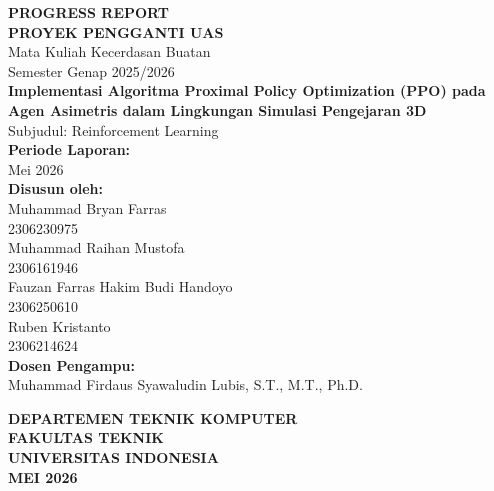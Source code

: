 \documentclass[12pt,a4paper]{article}
\begin{document}
\begin{titlepage}
    \centering
    \vspace*{1cm}
    
    {\Large \textbf{PROGRESS REPORT}} \\[0.5cm]
    {\Large \textbf{PROYEK PENGGANTI UAS}} \\[0.5cm]
    
    {\large Mata Kuliah Kecerdasan Buatan} \\[0.2cm]
    {\large Semester Genap 2025/2026} \\[2cm]
    
    {\Large \textbf{Implementasi Algoritma Proximal Policy Optimization (PPO) pada Agen Asimetris dalam Lingkungan Simulasi Pengejaran 3D}} \\[0.5cm]
    {\large Subjudul: Reinforcement Learning} \\[1.5cm]
    
    \textbf{Periode Laporan:} \\
    {Mei 2026} \\[1.5cm]
    
    \textbf{Disusun oleh:} \\[0.2cm]
    {Muhammad Bryan Farras} \\
    {2306230975} \\[0.2cm]
    {Muhammad Raihan Mustofa} \\
    {2306161946} \\[0.2cm]
    {Fauzan Farras Hakim Budi Handoyo} \\
    {2306250610} \\[0.2cm]
    {Ruben Kristanto} \\
    {2306214624} \\[1.5cm]
    
    \textbf{Dosen Pengampu:} \\
    {Muhammad Firdaus Syawaludin Lubis, S.T., M.T., Ph.D.} \\[1cm]
    
    \vfill
    
    {\large \textbf{DEPARTEMEN TEKNIK KOMPUTER}} \\
    {\large \textbf{FAKULTAS TEKNIK}} \\
    {\large \textbf{UNIVERSITAS INDONESIA}} \\
    {\large \textbf{MEI 2026}}
    
\end{titlepage}

\newpage
\tableofcontents
\newpage
\end{document}

